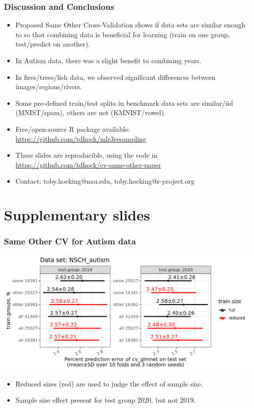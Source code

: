 \documentclass{beamer}
\begin{document}
\begin{frame}
  \frametitle{Discussion and Conclusions}
  \begin{itemize}
  \item Proposed Same Other Cross-Validation shows if
    data sets are similar enough to so that combining data is
    beneficial for learning (train on one group, test/predict on
    another).
  \item In Autism data, there was a slight benefit to combining years.
  \item In fires/trees/fish data, we observed
    significant differences between images/regions/rivers.
  \item Some pre-defined train/test splits in benchmark data sets
    are similar/iid (MNIST/spam), others are not (KMNIST/vowel).
  \item Free/open-source R package available:
    \url{https://github.com/tdhock/mlr3resampling}
  \item These slides are reproducible, using the code in \url{https://github.com/tdhock/cv-same-other-paper}
  \item Contact: toby.hocking@nau.edu,
    toby.hocking@r-project.org
  \end{itemize}
\end{frame}

\section{Supplementary slides}

\begin{frame}
  \frametitle{Same Other CV for Autism data}
  \includegraphics[width=\textwidth]{NSCH_autism_error_glmnet_sizes_mean_sd_more.png}
  \begin{itemize}
  \item Reduced sizes (red) are used to judge the effect of sample size.
  \item Sample size effect present for test group 2020, but not 2019.
  \end{itemize}
\end{frame}
\end{document}

